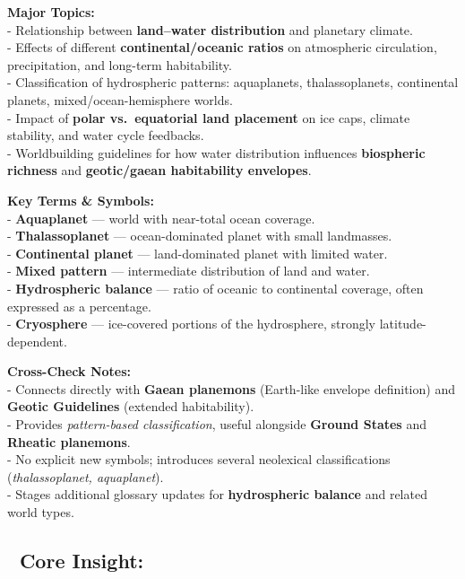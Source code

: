 \documentclass[
  letterpaper,
]{book}
\begin{document}
\textbf{Major Topics:}\\
- Relationship between \textbf{land--water distribution} and planetary
climate.\\
- Effects of different \textbf{continental/oceanic ratios} on
atmospheric circulation, precipitation, and long-term habitability.\\
- Classification of hydrospheric patterns: aquaplanets, thalassoplanets,
continental planets, mixed/ocean-hemisphere worlds.\\
- Impact of \textbf{polar vs.~equatorial land placement} on ice caps,
climate stability, and water cycle feedbacks.\\
- Worldbuilding guidelines for how water distribution influences
\textbf{biospheric richness} and \textbf{geotic/gaean habitability
envelopes}.

\textbf{Key Terms \& Symbols:}\\
- \textbf{Aquaplanet} --- world with near-total ocean coverage.\\
- \textbf{Thalassoplanet} --- ocean-dominated planet with small
landmasses.\\
- \textbf{Continental planet} --- land-dominated planet with limited
water.\\
- \textbf{Mixed pattern} --- intermediate distribution of land and
water.\\
- \textbf{Hydrospheric balance} --- ratio of oceanic to continental
coverage, often expressed as a percentage.\\
- \textbf{Cryosphere} --- ice-covered portions of the hydrosphere,
strongly latitude-dependent.

\textbf{Cross-Check Notes:}\\
- Connects directly with \textbf{Gaean planemons} (Earth-like envelope
definition) and \textbf{Geotic Guidelines} (extended habitability).\\
- Provides \emph{pattern-based classification}, useful alongside
\textbf{Ground States} and \textbf{Rheatic planemons}.\\
- No explicit new symbols; introduces several neolexical classifications
(\emph{thalassoplanet, aquaplanet}).\\
- Stages additional glossary updates for \textbf{hydrospheric balance}
and related world types.

\subsection{🔑 Core Insight:}\label{core-insight}
\end{document}
